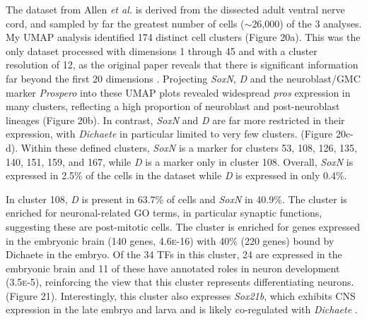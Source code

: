 \documentclass[withindex,glossary]{cam-thesis}
\begin{document}
The dataset from Allen \emph{et al.} is derived from the dissected adult
ventral nerve cord, and sampled by far the greatest number of cells
($\sim{}$26,000) of the 3 analyses. My UMAP analysis identified
174 distinct cell clusters (Figure 20a). This was the only dataset
processed with dimensions 1 through 45 and with a cluster resolution of
12, as the original paper reveals that there is significant information
far beyond the first 20 dimensions . Projecting
\emph{SoxN}, \emph{D} and the neuroblast/GMC marker \emph{Prospero}  into
these UMAP plots revealed widespread \emph{pros} expression in many
clusters, reflecting a high proportion of neuroblast and post-neuroblast
lineages (Figure 20b). In contrast, \emph{SoxN} and \emph{D} are far
more restricted in their expression, with \emph{Dichaete} in particular
limited to very few clusters. (Figure 20c-d).
Within these defined clusters, \emph{SoxN} is a marker for clusters 53,
108, 126, 135, 140, 151, 159, and 167, while \emph{D} is a marker only
in cluster 108. Overall, \emph{SoxN} is expressed in 2.5\% of the cells
in the dataset while \emph{D} is expressed in only 0.4\%.

In cluster 108, \emph{D} is present in 63.7\% of cells and \emph{SoxN}
in 40.9\%. The cluster is enriched for neuronal-related GO terms, in
particular synaptic functions, suggesting these are post-mitotic cells.
The cluster is enriched for genes expressed in the embryonic brain (140
genes, 4.6\textsc{e}-16) with 40\% (220 genes) bound by Dichaete in the embryo.
Of the 34 TFs in this cluster, 24 are expressed in the embryonic brain
and 11 of these have annotated roles in neuron development (3.5\textsc{e}-5),
reinforcing the view that this cluster represents differentiating
neurons. (Figure 21). Interestingly, this cluster also expresses
\emph{Sox21b}, which exhibits CNS expression in the
late embryo and larva and is likely co-regulated with \emph{Dichaete}
.
\end{document}

